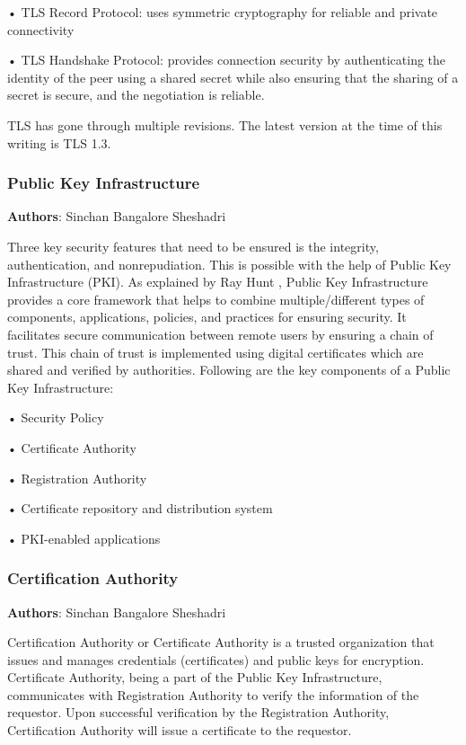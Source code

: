 •	TLS Record Protocol: uses symmetric cryptography for reliable and private connectivity

•	TLS Handshake Protocol: provides connection security by authenticating the identity of the peer using a shared secret while also ensuring that the sharing of a secret is secure, and the negotiation is reliable.\footnotemark


TLS has gone through multiple revisions. The latest version at the time of this writing is TLS 1.3.


\subsubsection{Public Key Infrastructure}
\textbf{Authors}: Sinchan Bangalore Sheshadri

Three key security features that need to be ensured is the integrity, authentication, and nonrepudiation. This is possible with the help of Public Key Infrastructure (PKI). As explained by Ray Hunt \cite{962346}, Public Key Infrastructure provides a core framework that helps to combine multiple/different types of components, applications, policies, and practices for ensuring security. It facilitates secure communication between remote users by ensuring a chain of trust. This chain of trust is implemented using digital certificates which are shared and verified by authorities. Following are the key components of a Public Key Infrastructure:

•	Security Policy

•	Certificate Authority

•	Registration Authority

•	Certificate repository and distribution system

•	PKI-enabled applications

\subsubsection{Certification Authority}
\textbf{Authors}: Sinchan Bangalore Sheshadri

Certification Authority or Certificate Authority is a trusted organization that issues and manages credentials (certificates) and public keys for encryption. Certificate Authority, being a part of the Public Key Infrastructure, communicates with Registration Authority to verify the information of the requestor. Upon successful verification by the Registration Authority, Certification Authority will issue a certificate to the requestor.



